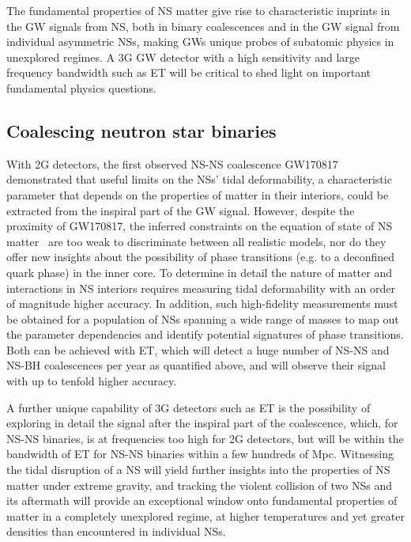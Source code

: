 The fundamental properties of NS matter give rise to characteristic imprints in the GW signals from NS, both in  binary coalescences and in the GW signal from individual asymmetric NSs, making GWs unique probes of subatomic physics in unexplored regimes. A 3G GW detector with a high sensitivity and large frequency bandwidth such as ET will be critical to shed light on important fundamental physics questions. 


\subsection{Coalescing neutron star binaries} 

With 2G detectors, the first observed NS-NS coalescence
GW170817 demonstrated that useful limits on the NSs' tidal deformability, a characteristic parameter that depends on the properties of matter in their interiors, could be extracted from the inspiral part of the GW signal.%
However, despite the proximity of GW170817, the inferred constraints on the equation of state of NS matter~\cite{Abbott:2018exr}
are too weak to discriminate between all realistic models, nor do they offer 
new insights about the possibility of phase transitions (e.g. to a deconfined quark phase) in the inner core.
To determine in detail the nature of matter and interactions in NS interiors requires measuring tidal deformability with an order of magnitude higher accuracy. In addition, such high-fidelity measurements must be obtained for a population of NSs spanning a wide range of masses to map out the parameter dependencies and identify potential signatures of phase transitions. Both can be achieved with ET, which will detect a huge number of NS-NS and NS-BH coalescences per year as quantified above, and will observe their signal with up to tenfold higher accuracy. 

A further unique capability of 3G detectors such as ET is the possibility of exploring in detail the signal after the inspiral part of the coalescence, which, for NS-NS binaries, is at frequencies too high for 2G detectors, but will be within the bandwidth of ET for NS-NS binaries within a few hundreds of Mpc. Witnessing the tidal disruption of a NS  will yield further insights into the properties of NS matter under extreme gravity, and tracking the violent collision of two NSs and its aftermath will provide an exceptional window onto fundamental properties of matter in a completely unexplored regime, at higher temperatures and yet greater densities than encountered in individual NSs. 

